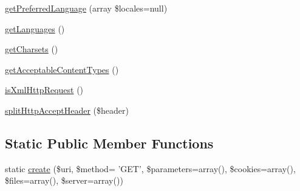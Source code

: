 \begin{DoxyCompactItemize}
\item 
\hyperlink{class_symfony_1_1_component_1_1_http_foundation_1_1_request_a478234e2bcc53fa4cde48a52484fea68}{get\-Preferred\-Language} (array \$locales=null)
\item 
\hyperlink{class_symfony_1_1_component_1_1_http_foundation_1_1_request_ada2ef7bac2979b90332fe9a527c60667}{get\-Languages} ()
\item 
\hyperlink{class_symfony_1_1_component_1_1_http_foundation_1_1_request_a86208cd55f8c21b7b3138f1502c0a4d9}{get\-Charsets} ()
\item 
\hyperlink{class_symfony_1_1_component_1_1_http_foundation_1_1_request_a575b1c4167619497f7dc11eaceac6a69}{get\-Acceptable\-Content\-Types} ()
\item 
\hyperlink{class_symfony_1_1_component_1_1_http_foundation_1_1_request_a7f970395d954dfaebfe69d7e62d55c25}{is\-Xml\-Http\-Request} ()
\item 
\hyperlink{class_symfony_1_1_component_1_1_http_foundation_1_1_request_a49d777a6014dbd7ea76bd597ce77bd1f}{split\-Http\-Accept\-Header} (\$header)
\end{DoxyCompactItemize}
\subsection*{\-Static \-Public \-Member \-Functions}
\begin{DoxyCompactItemize}
\item 
static \hyperlink{class_symfony_1_1_component_1_1_http_foundation_1_1_request_a7dad66e7b5a3625cc914e013dc3b19ab}{create} (\$uri, \$method= '\-G\-E\-T', \$parameters=array(), \$cookies=array(), \$files=array(), \$server=array())
\end{DoxyCompactItemize}
